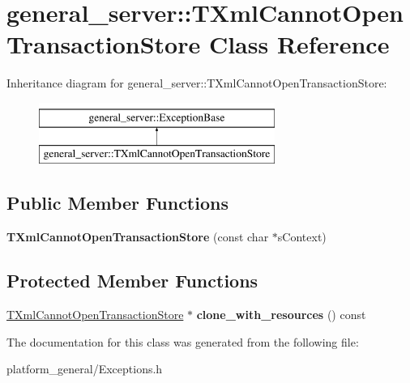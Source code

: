 \hypertarget{classgeneral__server_1_1TXmlCannotOpenTransactionStore}{\section{general\-\_\-server\-:\-:\-T\-Xml\-Cannot\-Open\-Transaction\-Store \-Class \-Reference}
\label{classgeneral__server_1_1TXmlCannotOpenTransactionStore}
}
\-Inheritance diagram for general\-\_\-server\-:\-:\-T\-Xml\-Cannot\-Open\-Transaction\-Store\-:\begin{figure}[H]
\begin{center}
\leavevmode
\includegraphics[height=2.000000cm]{classgeneral__server_1_1TXmlCannotOpenTransactionStore}
\end{center}
\end{figure}
\subsection*{\-Public \-Member \-Functions}
\begin{DoxyCompactItemize}
\item 
\hypertarget{classgeneral__server_1_1TXmlCannotOpenTransactionStore_a46de99e848d58cf50d5aaaaf903d2ffe}{{\bfseries \-T\-Xml\-Cannot\-Open\-Transaction\-Store} (const char $\ast$s\-Context)}\label{classgeneral__server_1_1TXmlCannotOpenTransactionStore_a46de99e848d58cf50d5aaaaf903d2ffe}

\end{DoxyCompactItemize}
\subsection*{\-Protected \-Member \-Functions}
\begin{DoxyCompactItemize}
\item 
\hypertarget{classgeneral__server_1_1TXmlCannotOpenTransactionStore_a36432be15c0d87fb04417885f503a29f}{\hyperlink{classgeneral__server_1_1TXmlCannotOpenTransactionStore}{\-T\-Xml\-Cannot\-Open\-Transaction\-Store} $\ast$ {\bfseries clone\-\_\-with\-\_\-resources} () const }\label{classgeneral__server_1_1TXmlCannotOpenTransactionStore_a36432be15c0d87fb04417885f503a29f}

\end{DoxyCompactItemize}


\-The documentation for this class was generated from the following file\-:\begin{DoxyCompactItemize}
\item 
platform\-\_\-general/\-Exceptions.\-h\end{DoxyCompactItemize}
